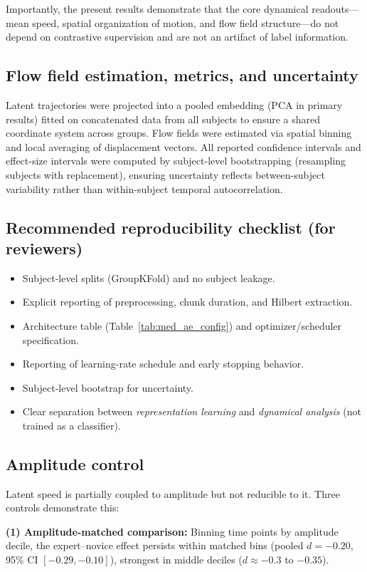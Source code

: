 \documentclass[5p,twocolumn,authoryear]{elsarticle}
\newcommand{\tabref}[1]{Table~\ref{#1}}
\begin{document}
Importantly, the present results demonstrate that the core dynamical readouts—mean speed, spatial organization of motion, and flow field structure—do not depend on contrastive supervision and are not an artifact of label information.
\subsection{Flow field estimation, metrics, and uncertainty}
\label{app:flow_metrics}
Latent trajectories were projected into a pooled embedding (PCA in primary results) fitted on concatenated data from all subjects to ensure a shared coordinate system across groups. Flow fields were estimated via spatial binning and local averaging of displacement vectors. All reported confidence intervals and effect-size intervals were computed by subject-level bootstrapping (resampling subjects with replacement), ensuring uncertainty reflects between-subject variability rather than within-subject temporal autocorrelation.

\subsection{Recommended reproducibility checklist (for reviewers)}
\begin{itemize}
    \item Subject-level splits (GroupKFold) and no subject leakage.
    \item Explicit reporting of preprocessing, chunk duration, and Hilbert extraction.
    \item Architecture table (\tabref{tab:med_ae_config}) and optimizer/scheduler specification.
    \item Reporting of learning-rate schedule and early stopping behavior.
    \item Subject-level bootstrap for uncertainty.
    \item Clear separation between \emph{representation learning} and \emph{dynamical analysis} (not trained as a classifier).
\end{itemize}

\subsection{Amplitude control}
\label{app:amplitude_control}

Latent speed is partially coupled to amplitude but not reducible to it. Three controls demonstrate this:

\textbf{(1) Amplitude-matched comparison:} Binning time points by amplitude decile, the expert--novice effect persists within matched bins (pooled $d = -0.20$, 95\% CI $[-0.29, -0.10]$), strongest in middle deciles ($d \approx -0.3$ to $-0.35$).
\end{document}
